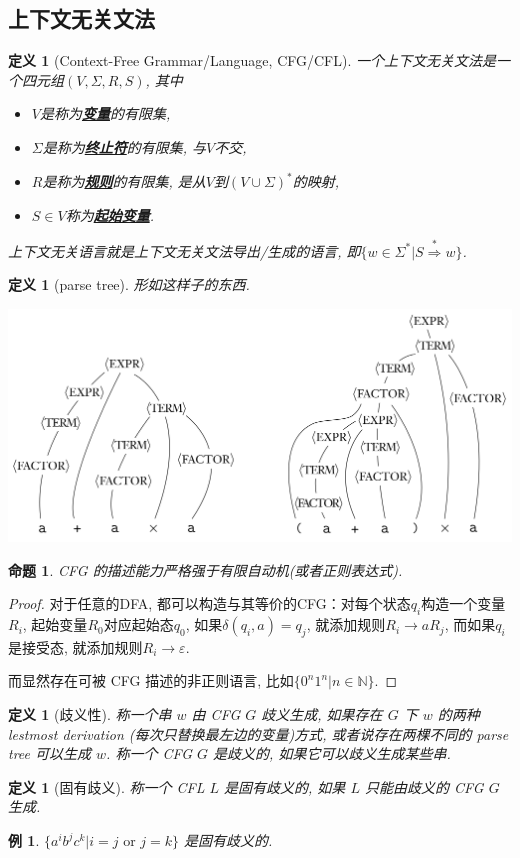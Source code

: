 \documentclass[8pt]{article}
\theoremstyle{compact}
\newtheorem{definition}[theorem]{定义}
\newtheorem{proposition}[theorem]{命题}
\newtheorem{example}[theorem]{例}
\def\obj#1{\textbf{\uline{#1}}}
\begin{document}
\subsection{上下文无关文法}
\begin{definition}[Context-Free Grammar/Language, CFG/CFL]
	一个上下文无关文法是一个四元组$(V, \Sigma, R, S)$, 其中
	\begin{itemize}
		\item $V$是称为\obj{变量}的有限集, 
		\item $\Sigma$是称为\obj{终止符}的有限集, 与$V$不交, 
		\item $R$是称为\obj{规则}的有限集, 是从$V$到$(V \cup \Sigma)^*$的映射, 
		\item $S \in V$称为\obj{起始变量}. 
	\end{itemize}

	上下文无关语言就是上下文无关文法导出/生成的语言, 即$\{w \in \Sigma^* | S \overset{*}{\Rightarrow} w\}$. 
\end{definition}
\begin{definition}[parse tree]
	形如这样子的东西.
	\begin{center}
		\includegraphics*[scale=0.4]{pic/parse_tree.png}	
	\end{center}
\end{definition}
\begin{proposition}
	CFG 的描述能力严格强于有限自动机(或者正则表达式). 
\end{proposition}
\begin{proof}
	对于任意的DFA, 都可以构造与其等价的CFG：对每个状态$q_i$构造一个变量$R_i$, 起始变量$R_0$对应起始态$q_0$, 如果$\delta(q_i, a) = q_j$, 就添加规则$R_i \to aR_j$, 而如果$q_i$是接受态, 就添加规则$R_i \to \varepsilon$. 

	而显然存在可被 CFG 描述的非正则语言, 比如$\{0^n1^n | n \in \mathbb N\}$. 
\end{proof}
\begin{definition}[歧义性]
	称一个串 $w$ 由 CFG $G$ 歧义生成, 如果存在 $G$ 下 $w$ 的两种 lestmost derivation (每次只替换最左边的变量)方式, 或者说存在两棵不同的 parse tree 可以生成 $w$. 称一个 CFG $G$ 是歧义的, 如果它可以歧义生成某些串.
\end{definition}
\begin{definition}[固有歧义]
	称一个 CFL $L$ 是固有歧义的, 如果 $L$ 只能由歧义的 CFG $G$ 生成.
\end{definition}
\begin{example}
	$\{a^ib^jc^k | i = j \textrm{ or } j = k\}$ 是固有歧义的.
\end{example}
\end{document}
